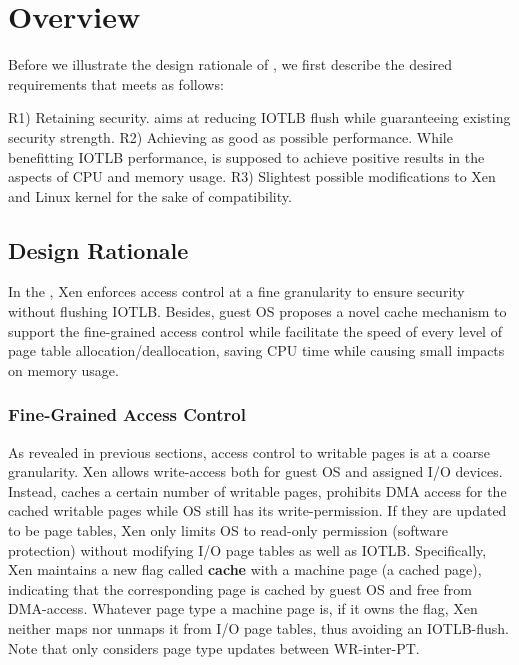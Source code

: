 \section{\name Overview} \label{sec:overview}
Before we illustrate the design rationale of \name, we first describe the desired requirements that \name meets as follows:

R1) Retaining security. \name aims at reducing IOTLB flush while guaranteeing existing security strength.
R2) Achieving as good as possible performance. While benefitting IOTLB performance, \name is supposed to achieve positive results in the aspects of CPU and memory usage.
R3) Slightest possible modifications to Xen and Linux kernel for the sake of compatibility.

\subsection{Design Rationale}
In the \name, Xen enforces access control at a fine granularity to ensure security without flushing IOTLB. Besides, guest OS proposes a novel cache mechanism to support the fine-grained access control while facilitate the speed of every level of page table allocation/deallocation, saving CPU time while causing small impacts on memory usage.

\subsubsection{Fine-Grained Access Control}
As revealed in previous sections, access control to writable pages is at a coarse granularity. Xen allows write-access both for guest OS and assigned I/O devices. Instead, \name caches a certain number of writable pages, prohibits DMA access for the cached writable pages while OS still has its write-permission. If they are updated to be page tables, Xen only limits OS to read-only permission (software protection) without modifying I/O page tables as well as IOTLB. Specifically, Xen maintains a new flag called \textbf{cache} with a machine page (a cached page), indicating that the corresponding page is cached by guest OS and free from DMA-access. Whatever page type a machine page is, if it owns the flag, Xen neither maps nor unmaps it from I/O page tables, thus avoiding an IOTLB-flush. Note that \name only considers page type updates between WR-inter-PT.

